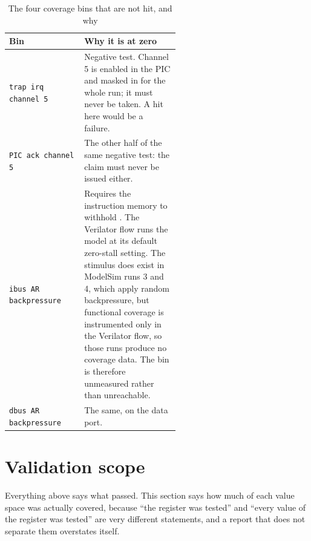 \begin{table}[H]
\centering
\caption{The four coverage bins that are not hit, and why}
\label{tab:covmiss}
\begin{tabular}{@{}lL{0.56\linewidth}@{}}
\toprule
\textbf{Bin} & \textbf{Why it is at zero} \\
\midrule
\texttt{trap irq channel 5} & Negative test. Channel 5 is enabled in the PIC and
  masked in  for the whole run; it must never be taken. A hit here
  would be a failure. \\
\texttt{PIC ack channel 5} & The other half of the same negative test: the claim
  must never be issued either. \\
\texttt{ibus AR backpressure} & Requires the instruction memory to withhold
  . The Verilator flow runs the model at its default zero-stall
  setting. The stimulus does exist in ModelSim runs 3 and 4, which apply random
   backpressure, but functional coverage is instrumented only in the
  Verilator flow, so those runs produce no coverage data. The bin is therefore
  unmeasured rather than unreachable. \\
\texttt{dbus AR backpressure} & The same, on the data port. \\
\bottomrule
\end{tabular}
\end{table}

\section{Validation scope}
\label{sec:valscope}

Everything above says what passed. This section says how much of each value
space was actually covered, because ``the register was tested'' and ``every
value of the register was tested'' are very different statements, and a report
that does not separate them overstates itself.

